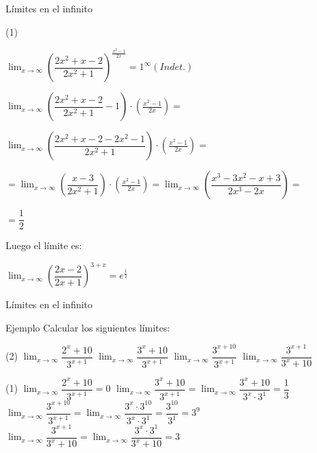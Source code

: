 \documentclass[8pt]{beamer}
\newcommand{\limite}[2]{\displaystyle \lim_{x \rightarrow #1}{#2}}
\begin{document}
\begin{frame}{Límites en el infinito}
\begin{tasks}[label=\alph*),resume](1)

\task $\limite{\infty}{\left( \dfrac{2x^2+x-2}{2x^2+1}\right)^{\frac{x^2-1}{2x}}}=1^{\infty} (Indet.)$

\vspace{10pt}


$\limite{\infty}{\left( \dfrac{2x^2+x-2}{2x^2+1}-1\right)\cdot \left( \frac{x^2-1}{2x} \right)}= $
\vspace{10pt}


$\limite{\infty}{\left( \dfrac{2x^2+x-2-2x^2-1}{2x^2+1}\right)\cdot\left( \frac{x^2-1}{2x} \right)}= $

\vspace{10pt}

$= \limite{\infty}{\left( \dfrac{x-3}{2x^2+1}\right)\cdot\left( \frac{x^2-1}{2x} \right)}=
\limite{\infty}{\left( \dfrac{x^3-3x^2-x+3}{2x^3-2x}\right)}= $

\vspace{10pt}

$=\dfrac{1}{2}$

\vspace{10pt}

Luego el límite es: 

\vspace{10pt}
$\limite{\infty}{\left( \dfrac{2x-2}{2x+1}\right)^{3+x}}= e^{\frac{1}{2}}$


\end{tasks}
\end{frame}

\begin{frame}{Límites en el infinito}
\begin{exampleblock}{Ejemplo}
Calcular los siguientes límites:
\begin{tasks}[label=\alph*)](2)
\task $\limite{\infty}{\dfrac{2^x+10}{3^{x+1}}}$
\task $\limite{\infty}{\dfrac{3^x+10}{3^{x+1}}}$
\task $\limite{\infty}{\dfrac{3^{x+10}}{3^{x+1}}}$
\task $\limite{\infty}{\dfrac{3^{x+1}}{3^x+10}}$

\end{tasks}
\end{exampleblock}

\begin{tasks}[label=\alph*)](1)
\task $\limite{\infty}{\dfrac{2^x+10}{3^{x+1}}}= 0$
\task $\limite{\infty}{\dfrac{3^x+10}{3^{x+1}}}= \limite{\infty}{\dfrac{3^x+10}{3^x\cdot 3^1}}= \dfrac{1}{3} $
\task $\limite{\infty}{\dfrac{3^{x+10}}{3^{x+1}}}= \limite{\infty}{\dfrac{3^x\cdot 3^{10}}{3^x\cdot 3^1}}= \dfrac{3^{10}}{3^1}= 3^9$
\task $\limite{\infty}{\dfrac{3^{x+1}}{3^x+10}}= \limite{\infty}{\dfrac{3^x\cdot 3^1}{3^x+10}}= 3$

\end{tasks}

\end{frame}
\end{document}
